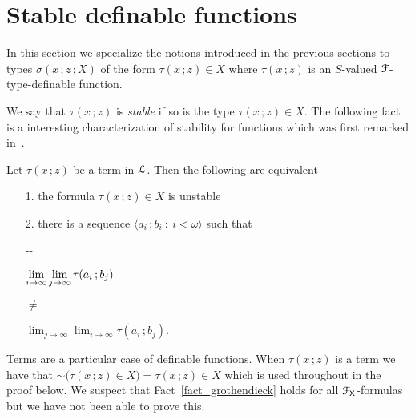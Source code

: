 \section{Stable definable functions}
\def\medrel#1{\parbox{5ex}{\hfil $#1$}}
\def\ceq#1#2#3{\parbox[t]{28ex}{$\displaystyle #1$}\medrel{#2}{$\displaystyle #3$}}

In this section we specialize the notions introduced in the previous sections to types $\sigma(x\,;z\,;X)$ of the form $\tau(x\,;z)\in X$ where $\tau(x\,;z)$ is an $S$-valued ${\EuScript F}$-type-definable function.

We say that $\tau(x\,;z)$ is \emph{stable\/} if so is the type $\tau(x\,;z)\in X$.
The following fact is a interesting characterization of stability for functions which was first remarked in~\cite{B}.

\begin{fact}\label{fact_grothendieck}
  Let $\tau(x\,;z)$ be a term in ${\EuScript L}$.
  Then the following are equivalent
  \begin{itemize}
    \item [1.] the formula $\tau(x\,;z)\in X$ is unstable
    \item [2.] there is a sequence $\langle a_i\,;b_i\ :\ i<\omega\rangle$ such that\smallskip
    
    \noindent\kern-\kern-
    \ceq{\hfill \lim_{i\to\infty}\lim_{j\to\infty}\tau(a_i\,;b_j)}{\neq}{\lim_{j\to\infty}\lim_{i\to\infty}\tau(a_i\,;b_j).}

    



  \end{itemize}
\end{fact}  
  Terms are a particular case of definable functions.
  When $\tau(x\,;z)$ is a term we have that ${\sim}\big(\tau(x\,;z)\in X\big)=\tau(x\,;z)\in X$ which is used throughout in the proof below.
  We suspect that Fact~\ref{fact_grothendieck} holds for all ${\EuScript F}_{\sf X}$-formulas but we have not been able to prove this.

